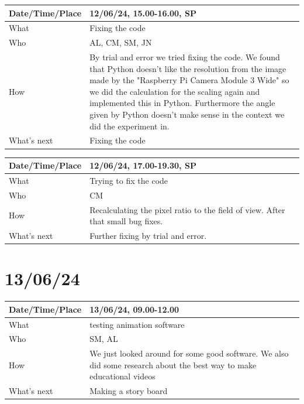\documentclass{article}
\begin{document}
\begin{table}[H]
\begin{tabular}{|p{1.5in}|p{4in}|}
\hline
Date/Time/Place & 12/06/24, 15.00-16.00, SP \\ \hline
What            &  Fixing the code\\ \hline
Who             &  AL, CM, SM, JN\\ \hline
How             & By trial and error we tried fixing the code. We found that Python doesn't like the resolution from the image made by the "Raspberry Pi Camera Module 3 Wide" so we did the calculation for the scaling again and implemented this in Python. Furthermore the angle given by Python doesn't make sense in the context we did the experiment in.   \\ \hline
What's next     & Fixing the code \\ \hline
\end{tabular}
\end{table}

\begin{table}[H]
\begin{tabular}{|p{1.5in}|p{4in}|}
\hline
Date/Time/Place & 12/06/24, 17.00-19.30, SP \\ \hline
What            & Trying to fix the code \\ \hline
Who             & CM \\ \hline
How             & Recalculating the pixel ratio to the field of view. After that small bug fixes. \\ \hline
What's next     & Further fixing by trial and error.  \\ \hline
\end{tabular}
\end{table}

\section{13/06/24}

\begin{table}[H]
\begin{tabular}{|p{1.5in}|p{4in}|}
\hline
Date/Time/Place &  13/06/24, 09.00-12.00\\ \hline
What            &  testing animation software\\ \hline
Who             &  SM, AL\\ \hline
How             &  We just looked around for some good software. We also did some research about the best way to make educational videos\\ \hline
What's next     & Making a story board\\ \hline
\end{tabular}
\end{table}
\end{document}
